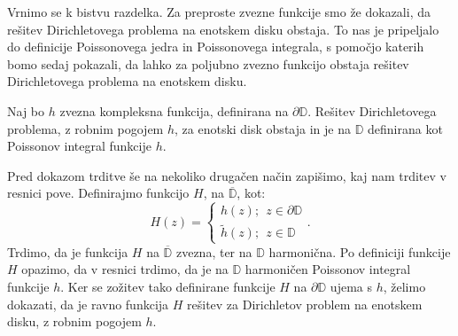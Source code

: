 \documentclass[mat1]{fmfdelo}
\begin{document}
    Vrnimo se k bistvu razdelka. Za preproste zvezne funkcije smo že dokazali, da rešitev Dirichletovega problema na enotskem disku obstaja. To nas je pripeljalo do definicije Poissonovega jedra in Poissonovega integrala, s pomočjo katerih bomo sedaj pokazali, da lahko za poljubno zvezno funkcijo obstaja rešitev Dirichletovega problema na enotskem disku.
    \begin{trditev}
        \label{obstoj}
        Naj bo $h$ zvezna kompleksna funkcija, definirana na $\partial \mathbb{D}$. Rešitev Dirichletovega problema, z robnim pogojem $h$, za enotski disk obstaja in je na $\mathbb{D}$ definirana kot Poissonov integral funkcije $h$.
    \end{trditev}
    \begin{opomba}
        \label{opomba_obstoj}
        Pred dokazom trditve še na nekoliko drugačen način zapišimo, kaj nam trditev v resnici pove. 
        Definirajmo funkcijo $H$, na $\overline{\mathbb{D}}$, kot:
        $$
            H(z) = \begin{cases}
                    h(z);~~z \in \partial \mathbb{D}\\
                    \widetilde{h}(z);~~z \in \mathbb{D}
            \end{cases}.
        $$
        Trdimo, da je funkcija $H$ na $\overline{\mathbb{D}}$ zvezna, ter na $\mathbb{D}$ harmonična. Po definiciji funkcije $H$ opazimo, da v resnici trdimo, da je na $\mathbb{D}$ harmoničen Poissonov integral funkcije $h$. 
        Ker se zožitev tako definirane funkcije $H$ na $\partial \mathbb{D}$ ujema s $h$, želimo dokazati, da je ravno funkcija $H$ rešitev za Dirichletov problem na enotskem disku, z robnim pogojem $h$.
     \end{opomba}
\end{document}
